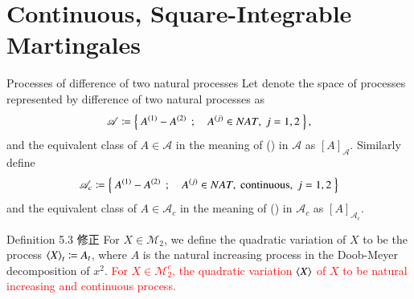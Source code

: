 \section{Continuous, Square-Integrable Martingales}
	\begin{itembox}[l]{Processes of difference of two natural processes}
		Let denote the space of processes represented by difference of two natural processes as
		\begin{align}
			\mathscr{A} \coloneqq \left\{\ A^{(1)} - A^{(2)}\ \, ; \quad A^{(j)} \in NAT,\ j=1,2\ \right\},
		\end{align}
		and the equivalent class of $A \in \mathscr{A}$ in the meaning of
		() in $\mathscr{A}$ as
		$[A]_{\mathscr{A}}$. Similarly define
		\begin{align}
			\mathscr{A}_c \coloneqq \left\{\ A^{(1)} - A^{(2)}\ \, ; \quad A^{(j)} \in NAT,\ \mbox{continuous},\ j=1,2\ \right\}
		\end{align}
		and the equivalent class of $A \in \mathscr{A}_c$ in the meaning of
		() in $\mathscr{A}_c$ as
		$[A]_{\mathscr{A}_c}$.
	\end{itembox}
	
	\begin{itembox}[l]{Definition 5.3 修正}
		For $X \in \mathscr{M}_2$, we define the quadratic variation of $X$ to be the process $\inprod<X>_t \coloneqq A_t$,
		where $A$ is the natural increasing process in the Doob-Meyer decomposition of $x^2$.
		\textcolor{red}{For $X \in \mathscr{M}_2^c$, the quadratic variation $\inprod<X>$ of $X$ 
		to be natural increasing and continuous process.}
	\end{itembox}
	
